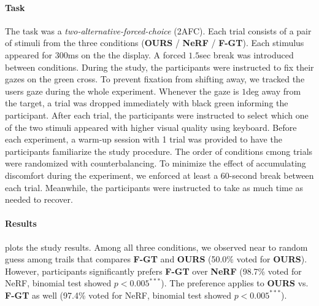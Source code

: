 \paragraph{Task}
The task was a \textit{two-alternative-forced-choice} (2AFC). Each trial consists of a pair of stimuli from the three conditions ({\bf OURS} / {\bf NeRF} / {\bf F-GT}). Each stimulus appeared for $300$ms on the the display. A forced $1.5$sec break was introduced between conditions. During the study, the participants were instructed to fix their gazes on the green cross. To prevent fixation from shifting away, we tracked the users gaze during the whole experiment. Whenever the gaze is $1$deg away from the target, a trial was dropped immediately with black green informing the participant.
After each trial, the participants were instructed to select which one of the two stimuli appeared with higher visual quality using keyboard.
Before each experiment, a warm-up session with 1 trial was provided to have the participants familiarize the study procedure. The order of conditions cmong trials were randomized with counterbalancing.
To minimize the effect of accumulating discomfort during the experiment, we enforced at least a 60-second break between each trial. Meanwhile, the participants were instructed to take as much time as needed to recover. 

\paragraph{Results}
 plots the study results. 
Among all three conditions, we observed near to random guess among trails that compares  {\bf F-GT} and {\bf OURS} (50.0\% voted for {\bf OURS}). However, participants significantly prefers  {\bf F-GT} over {\bf NeRF} (98.7\% voted for NeRF, binomial test showed $p<0.005^{***}$). The preference applies to {\bf OURS} vs. {\bf F-GT} as well (97.4\% voted for NeRF, binomial test showed $p<0.005^{***}$).

